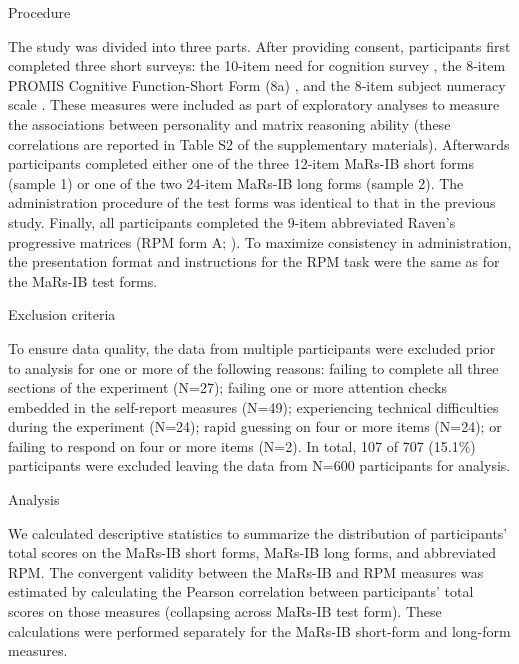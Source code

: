 \documentclass[a4paper,man,natbib,noextraspace]{apa6}
\makeatletter
\renewcommand{\subsubsection}{\@startsection{subsubsection}{3}
  {\z@}%
  {\b@level@two@skip}{\e@level@two@skip}%
  {\normalfont\normalsize\bfseries}}
\makeatother
\begin{document}
\subsubsection{Procedure}

The study was divided into three parts. After providing consent, participants first completed three short surveys: the 10-item need for cognition survey \citep{chiesi2018applying}, the 8-item PROMIS Cognitive Function-Short Form (8a) \citep{iverson2021normative}, and the 8-item subject numeracy scale \citep{fagerlin2007measuring}. These measures were included as part of exploratory analyses to measure the associations between personality and matrix reasoning ability (these correlations are reported in Table S2 of the supplementary materials). Afterwards participants completed either one of the three 12-item MaRs-IB short forms (sample 1) or one of the two 24-item MaRs-IB long forms (sample 2). The administration procedure of the test forms was identical to that in the previous study. Finally, all participants completed the 9-item abbreviated Raven's progressive matrices (RPM form A; \citealt{bilker2012development}). To maximize consistency in administration, the presentation format and instructions for the RPM task were the same as for the MaRs-IB test forms.

\subsubsection{Exclusion criteria}

To ensure data quality, the data from multiple participants were excluded prior to analysis for one or more of the following reasons: failing to complete all three sections of the experiment (N=27); failing one or more attention checks \citep{zorowitz2021inattentive} embedded in the self-report measures (N=49); experiencing technical difficulties during the experiment (N=24); rapid guessing on four or more items (N=24); or failing to respond on four or more items (N=2). In total, 107 of 707 (15.1\%) participants were excluded leaving the data from N=600 participants for analysis.

\subsubsection{Analysis}

We calculated descriptive statistics to summarize the distribution of participants' total scores on the MaRs-IB short forms, MaRs-IB long forms, and abbreviated RPM. The convergent validity between the MaRs-IB and RPM measures was estimated by calculating the Pearson correlation between participants' total scores on those measures (collapsing across MaRs-IB test form). These calculations were performed separately for the MaRs-IB short-form and long-form measures.
\end{document}
